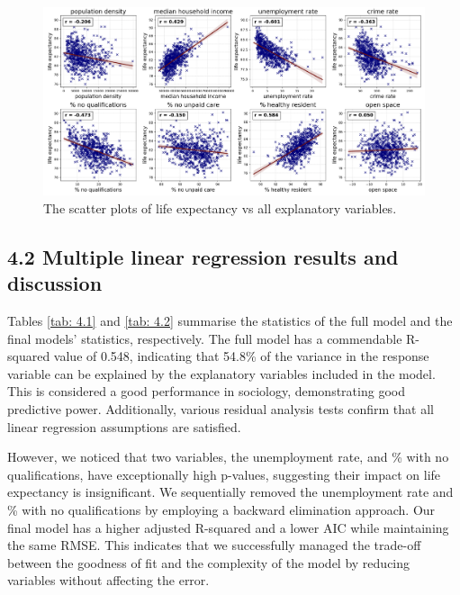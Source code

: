 \documentclass[a4paper,12pt]{article}
\begin{document}
\begin{figure}[h]\begin{center}
\includegraphics[width=.8\columnwidth]{qm_42.png}
\end{center}
\caption[]{
The scatter plots of life expectancy vs all explanatory variables.
}
\label{fig: 4.2}
\end{figure}

\subsection*{4.2 Multiple linear regression results and discussion}
Tables \ref{tab: 4.1} and \ref{tab: 4.2} summarise the statistics of the full model and the final models' statistics, respectively. The full model has a commendable R-squared value of 0.548, indicating that 54.8\% of the variance in the response variable can be explained by the explanatory variables included in the model. This is considered a good performance in sociology, demonstrating good predictive power. Additionally, various residual analysis tests confirm that all linear regression assumptions are satisfied.

However, we noticed that two variables, the unemployment rate, and \% with no qualifications, have exceptionally high p-values, suggesting their impact on life expectancy is insignificant. We sequentially removed the unemployment rate and \% with no qualifications by employing a backward elimination approach. Our final model has a higher adjusted R-squared and a lower AIC while maintaining the same RMSE. This indicates that we successfully managed the trade-off between the goodness of fit and the complexity of the model by reducing variables without affecting the error.
\end{document}
